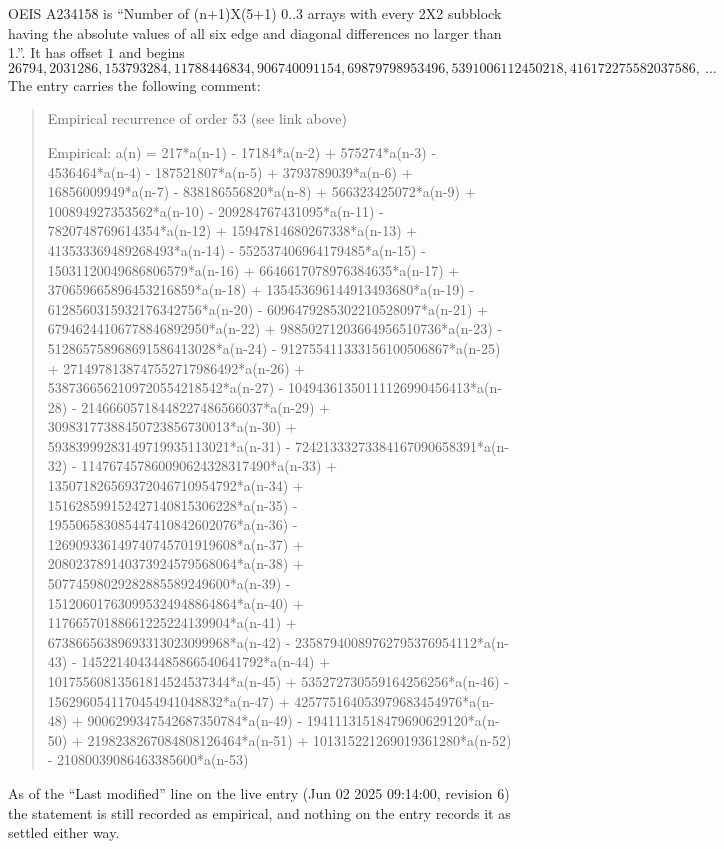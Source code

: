 \documentclass[11pt,a4paper]{article}
\theoremstyle{plain}
\theoremstyle{definition}
\begin{document}
OEIS A234158 is ``Number of (n+1)X(5+1) 0..3 arrays with every 2X2 subblock having the absolute values of all six edge and diagonal differences no larger than 1.''. It has offset $1$ and begins
\[
26794, 2031286, 153793284, 11788446834, 906740091154, 69879798953496, 5391006112450218, 416172275582037586,\ \dots
\]
The entry carries the following comment:
\begin{quote}\small
Empirical recurrence of order 53 (see link above)

Empirical: a(n) = 217*a(n-1) - 17184*a(n-2) + 575274*a(n-3) - 4536464*a(n-4) - 187521807*a(n-5) + 3793789039*a(n-6) + 16856009949*a(n-7) - 838186556820*a(n-8) + 566323425072*a(n-9) + 100894927353562*a(n-10) - 209284767431095*a(n-11) - 7820748769614354*a(n-12) + 15947814680267338*a(n-13) + 413533369489268493*a(n-14) - 552537406964179485*a(n-15) - 15031120049686806579*a(n-16) + 6646617078976384635*a(n-17) + 370659665896453216859*a(n-18) + 135453696144913493680*a(n-19) - 6128560315932176342756*a(n-20) - 6096479285302210528097*a(n-21) + 67946244106778846892950*a(n-22) + 98850271203664956510736*a(n-23) - 512865758968691586413028*a(n-24) - 912755411333156100506867*a(n-25) + 2714978138747552717986492*a(n-26) + 5387366562109720554218542*a(n-27) - 10494361350111126990456413*a(n-28) - 21466605718448227486566037*a(n-29) + 30983177388450723856730013*a(n-30) + 59383999283149719935113021*a(n-31) - 72421333273384167090658391*a(n-32) - 114767457860090624328317490*a(n-33) + 135071826569372046710954792*a(n-34) + 151628599152427140815306228*a(n-35) - 195506583085447410842602076*a(n-36) - 126909336149740745701919608*a(n-37) + 208023789140373924579568064*a(n-38) + 50774598029282885589249600*a(n-39) - 151206017630995324948864864*a(n-40) + 11766570188661225224139904*a(n-41) + 67386656389693313023099968*a(n-42) - 23587940089762795376954112*a(n-43) - 14522140434485866540641792*a(n-44) + 10175560813561814524537344*a(n-45) + 535272730559164256256*a(n-46) - 1562960541170454941048832*a(n-47) + 425775164053979683454976*a(n-48) + 9006299347542687350784*a(n-49) - 19411131518479690629120*a(n-50) + 2198238267084808126464*a(n-51) + 101315221269019361280*a(n-52) - 21080039086463385600*a(n-53)
\end{quote}
As of the ``Last modified'' line on the live entry (Jun 02 2025 09:14:00, revision 6) the statement is
still recorded as empirical, and nothing on the entry records it as settled either way.
\end{document}
